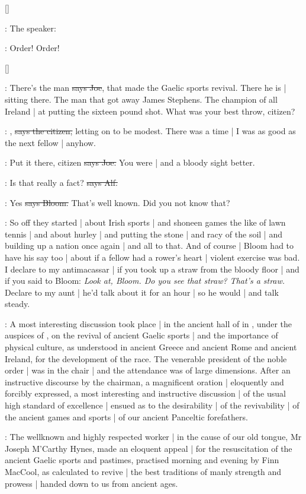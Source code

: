 []

:
The speaker:

\Speaker:
Order!
Order!

[]

\joe:
There's the man
\sout{says Joe},
that made the Gaelic sports revival.
There he is |
sitting there.
The man that got away James Stephens.
The champion of all Ireland |
at putting the sixteen pound shot.
What was your best throw,
citizen?

\citizen:
,
\sout{says the citizen,}
letting on to be modest.
There was a time |
I was as good as the next fellow |
anyhow.

\joe:
Put it there,
citizen
\sout{says Joe.}
You were |
and a bloody sight better.

\bergan:
Is that really a fact?
\sout{says Alf.}

\Bloom:
Yes
\sout{says Bloom.}
That's well known.
Did you not know that?

\Nq:
So off they started |
about Irish sports |
and shoneen games the like of lawn tennis |
and about hurley |
and putting the stone |
and racy of the soil |
and building up a nation once again |
and all to that.
And of course |
Bloom had to have his say too |
about if a fellow had a rower's heart |
violent exercise was bad.
I declare to my antimacassar |
if you took up a straw from the bloody floor |
and if you said to Bloom:
\emph{Look at,
Bloom.
Do you see that straw?
That's a straw.}
Declare to my aunt |
he'd talk about it for an hour |
so he would |
and talk steady.

:
A most interesting discussion took place |
in the ancient hall of
in ,
under the auspices of ,
on the revival of ancient Gaelic sports |
and the importance of physical culture,
as understood in ancient Greece and ancient Rome and ancient Ireland,
for the development of the race.
The venerable president of the noble order |
was in the chair |
and the attendance was of large dimensions.
After an instructive discourse by the chairman,
a magnificent oration |
eloquently and forcibly expressed,
a most interesting and instructive discussion |
of the usual high standard of excellence |
ensued as to the desirability |
of the revivability |
of the ancient games and sports |
of our ancient Panceltic forefathers.

:
The wellknown and highly respected worker |
in the cause of our old tongue,
Mr Joseph M'Carthy Hynes,
made an eloquent appeal |
for the resuscitation of the ancient Gaelic sports and pastimes,
practised morning and evening by Finn MacCool,
as calculated to revive |
the best traditions of manly strength and prowess |
handed down to us from ancient ages.

